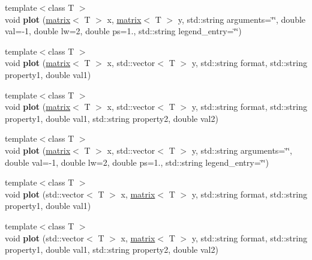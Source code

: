\begin{DoxyCompactItemize}
\item 
\hypertarget{classkeycpp_1_1_figure_a79f823ad4b62e20a85c9f1270e65fb01}{{\footnotesize template$<$class T $>$ }\\void {\bfseries plot} (\hyperlink{classkeycpp_1_1matrix}{matrix}$<$ T $>$ x, \hyperlink{classkeycpp_1_1matrix}{matrix}$<$ T $>$ y, std\-::string arguments=\char`\"{}\char`\"{}, double val=-\/1, double lw=2, double ps=1., std\-::string legend\-\_\-entry=\char`\"{}\char`\"{})}\label{classkeycpp_1_1_figure_a79f823ad4b62e20a85c9f1270e65fb01}

\item 
\hypertarget{classkeycpp_1_1_figure_a35b49db4a5665eaf2561f3f4c1f384a5}{{\footnotesize template$<$class T $>$ }\\void {\bfseries plot} (\hyperlink{classkeycpp_1_1matrix}{matrix}$<$ T $>$ x, std\-::vector$<$ T $>$ y, std\-::string format, std\-::string property1, double val1)}\label{classkeycpp_1_1_figure_a35b49db4a5665eaf2561f3f4c1f384a5}

\item 
\hypertarget{classkeycpp_1_1_figure_ae388faef03ea59e0bf96c1793db909a4}{{\footnotesize template$<$class T $>$ }\\void {\bfseries plot} (\hyperlink{classkeycpp_1_1matrix}{matrix}$<$ T $>$ x, std\-::vector$<$ T $>$ y, std\-::string format, std\-::string property1, double val1, std\-::string property2, double val2)}\label{classkeycpp_1_1_figure_ae388faef03ea59e0bf96c1793db909a4}

\item 
\hypertarget{classkeycpp_1_1_figure_ad3f084b29b2b32cb07632eaba766c77e}{{\footnotesize template$<$class T $>$ }\\void {\bfseries plot} (\hyperlink{classkeycpp_1_1matrix}{matrix}$<$ T $>$ x, std\-::vector$<$ T $>$ y, std\-::string arguments=\char`\"{}\char`\"{}, double val=-\/1, double lw=2, double ps=1., std\-::string legend\-\_\-entry=\char`\"{}\char`\"{})}\label{classkeycpp_1_1_figure_ad3f084b29b2b32cb07632eaba766c77e}

\item 
\hypertarget{classkeycpp_1_1_figure_aaf028e14b5cf294215cfa78fe1aeae3e}{{\footnotesize template$<$class T $>$ }\\void {\bfseries plot} (std\-::vector$<$ T $>$ x, \hyperlink{classkeycpp_1_1matrix}{matrix}$<$ T $>$ y, std\-::string format, std\-::string property1, double val1)}\label{classkeycpp_1_1_figure_aaf028e14b5cf294215cfa78fe1aeae3e}

\item 
\hypertarget{classkeycpp_1_1_figure_a85a510dd4a5acebaa8cd2351f3d5f208}{{\footnotesize template$<$class T $>$ }\\void {\bfseries plot} (std\-::vector$<$ T $>$ x, \hyperlink{classkeycpp_1_1matrix}{matrix}$<$ T $>$ y, std\-::string format, std\-::string property1, double val1, std\-::string property2, double val2)}\label{classkeycpp_1_1_figure_a85a510dd4a5acebaa8cd2351f3d5f208}


\end{DoxyCompactItemize}
